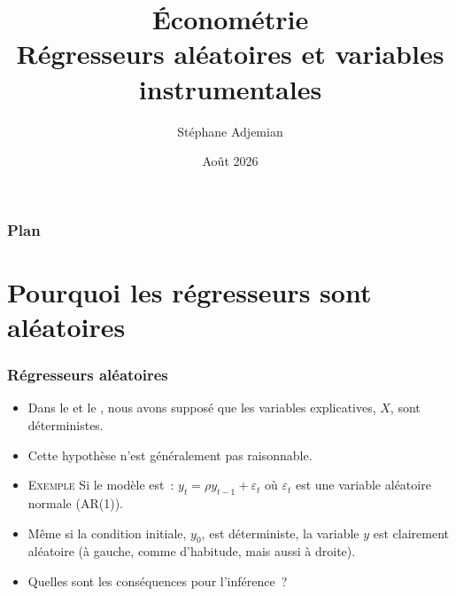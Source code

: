 \documentclass[10pt]{beamer}
\begin{document}
\title{Économétrie\\\small{Régresseurs aléatoires et variables instrumentales}}
\author[S. Adjemian]{Stéphane Adjemian}
\date{Août 2026}

\begin{frame}
  \titlepage{}
\end{frame}

\begin{frame}
  \frametitle{Plan}
  \tableofcontents
\end{frame}


\section{Pourquoi les régresseurs sont aléatoires}

\begin{frame}
  \frametitle{Régresseurs aléatoires}

  \begin{itemize}

  \item Dans le  et le , nous avons supposé que les
    variables explicatives, $X$, sont déterministes.\newline

  \item Cette hypothèse n'est généralement pas raisonnable.\newline

  \item \textsc{Exemple} Si le modèle est~: $y_t = \rho y_{t-1} + \varepsilon_t$
    où $\varepsilon_t$ est une variable aléatoire normale (AR(1)).\newline

  \item Même si la condition initiale, $y_0$, est déterministe, la variable $y$
    est clairement aléatoire (à gauche, comme d'habitude, mais aussi à
    droite).\newline

  \item Quelles sont les conséquences pour l'inférence~?\newline

  \end{itemize}


\end{frame}
\end{document}
